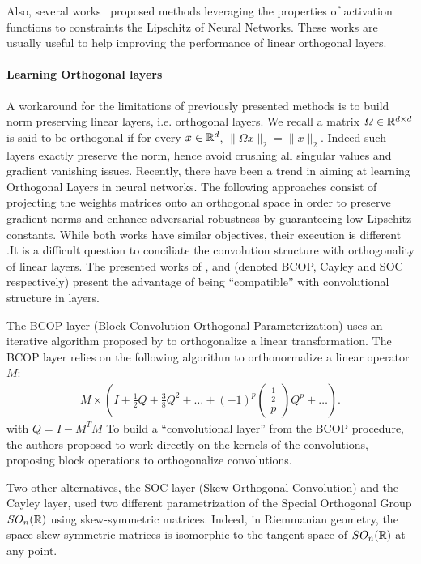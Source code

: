 Also, several works~\citep{anil2019sorting,singla2021householder,huang2021local} proposed methods leveraging the properties of activation functions to constraints the Lipschitz of Neural Networks. These works are usually useful to help  improving the performance of linear orthogonal layers.



\paragraph{Learning Orthogonal layers} A workaround for the limitations of previously presented methods is to build norm preserving linear layers, i.e. orthogonal layers. We recall a matrix $\Omega\in\mathbb{R}^{d\times d}$ is said to be orthogonal if for every $x\in\mathbb{R}^d$, $\lVert\Omega x\rVert_2 = \lVert x\rVert_2$. Indeed such layers exactly preserve the norm, hence avoid crushing all singular values and gradient vanishing issues. Recently, there have been a trend in aiming at learning Orthogonal Layers in neural networks.  The following approaches consist of projecting the weights matrices onto an orthogonal space in order to preserve gradient norms and enhance adversarial robustness by guaranteeing low Lipschitz constants. While both works have similar objectives, their execution is different .It is a difficult question to conciliate the convolution structure with orthogonality of linear layers. The presented works of \citet{li2019preventing}, \citet{trockman2021orthogonalizing} and \citet{skew2021sahil} (denoted BCOP, Cayley and SOC respectively) present the advantage of being ``compatible''  with convolutional structure in layers. 

The BCOP layer (Block Convolution Orthogonal Parameterization) uses an iterative algorithm proposed by \citet{bjorck1971iterative} to orthogonalize a linear transformation. The BCOP layer relies on the following algorithm to orthonormalize a linear operator $M$:
\begin{align*}
 M\times\left(I+\frac12Q+\frac38Q^2+\dots+(-1)^p\begin{pmatrix} \frac12\\p \end{pmatrix}
Q^p+\dots \right).
\end{align*}
with $Q = I-M^TM$ 
To build a ``convolutional layer'' from the BCOP procedure, the authors proposed to work directly on the kernels of the convolutions, proposing block operations to orthogonalize convolutions.

Two other alternatives, the SOC layer (Skew Orthogonal Convolution) and the Cayley layer, used two different parametrization of the Special Orthogonal Group $SO_n(\mathbb{R})$ using skew-symmetric matrices. Indeed, in Riemmanian geometry, the space skew-symmetric matrices is isomorphic to the tangent space of $SO_n(\mathbb{R})$ at any point. 

